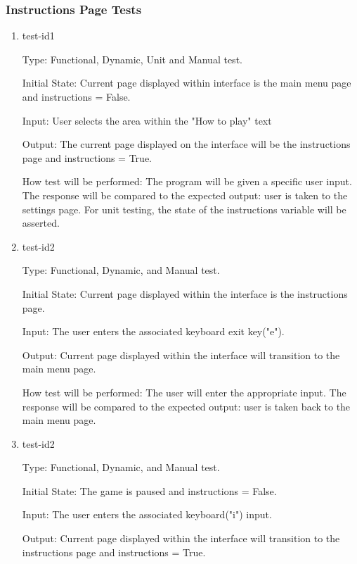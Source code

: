 \documentclass[12pt, titlepage]{article}
\begin{document}
\subsubsection{Instructions Page Tests}

\begin{enumerate}

\item{test-id1\\}

Type: Functional, Dynamic, Unit and Manual test.
					
Initial State: Current page displayed within interface is the main menu page and instructions = False.
					
Input: User selects the area within the "How to play" text
					
Output: The current page displayed on the interface will be the instructions page and instructions = True.
					
How test will be performed: The program will be given a specific user input. The response will be compared to the expected output: user is taken to the settings page. For unit testing, the state of the instructions variable will be asserted.


\item{test-id2\\}

Type: Functional, Dynamic, and Manual test.
					
Initial State: Current page displayed within the interface is the instructions page.
					
Input: The user enters the associated keyboard exit key("e").
					
Output: Current page displayed within the interface will transition to the main menu page.
					
How test will be performed: The user will enter the appropriate input. The response will be compared to the expected output: user is taken back to the main menu page.


\item{test-id2\\}

Type: Functional, Dynamic, and Manual test.
					
Initial State:  The game is paused and instructions = False.
					
Input: The user enters the associated keyboard("i") input.
					
Output: Current page displayed within the interface will transition to the instructions page and instructions = True.
					

\end{enumerate}
\end{document}
